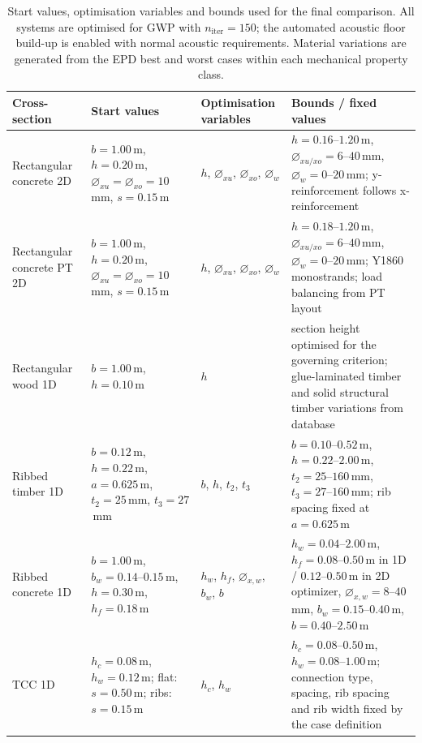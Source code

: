 \begin{table}[t]
    \centering
    \begingroup
    \scriptsize
    \setlength{\tabcolsep}{3pt}
    \renewcommand{\arraystretch}{1.15}
    \begin{tabularx}{\textwidth}{@{}l|X|X|X@{}}
    \hline
    \textbf{Cross-section} &
    \textbf{Start values} &
    \textbf{Optimisation variables} &
    \textbf{Bounds / fixed values} \\ \hline

    Rectangular concrete 2D &
    $b=1.00$\,m, $h=0.20$\,m, $\varnothing_{xu}=\varnothing_{xo}=10$\,mm, $s=0.15$\,m &
    $h$, $\varnothing_{xu}$, $\varnothing_{xo}$, $\varnothing_w$ &
    $h=0.16$--$1.20$\,m, $\varnothing_{xu/xo}=6$--$40$\,mm, $\varnothing_w=0$--$20$\,mm; y-reinforcement follows x-reinforcement \\

    Rectangular concrete PT 2D &
    $b=1.00$\,m, $h=0.20$\,m, $\varnothing_{xu}=\varnothing_{xo}=10$\,mm, $s=0.15$\,m &
    $h$, $\varnothing_{xu}$, $\varnothing_{xo}$, $\varnothing_w$ &
    $h=0.18$--$1.20$\,m, $\varnothing_{xu/xo}=6$--$40$\,mm, $\varnothing_w=0$--$20$\,mm; Y1860 monostrands; load balancing from PT layout \\

    Rectangular wood 1D &
    $b=1.00$\,m, $h=0.10$\,m &
    $h$ &
    section height optimised for the governing criterion; glue-laminated timber and solid structural timber variations from database \\

    Ribbed timber 1D &
    $b=0.12$\,m, $h=0.22$\,m, $a=0.625$\,m, $t_2=25$\,mm, $t_3=27$\,mm &
    $b$, $h$, $t_2$, $t_3$ &
    $b=0.10$--$0.52$\,m, $h=0.22$--$2.00$\,m, $t_2=25$--$160$\,mm, $t_3=27$--$160$\,mm; rib spacing fixed at $a=0.625$\,m \\

    Ribbed concrete 1D &
    $b=1.00$\,m, $b_w=0.14$--$0.15$\,m, $h=0.30$\,m, $h_f=0.18$\,m &
    $h_w$, $h_f$, $\varnothing_{x,w}$, $b_w$, $b$ &
    $h_w=0.04$--$2.00$\,m, $h_f=0.08$--$0.50$\,m in 1D / $0.12$--$0.50$\,m in 2D optimizer, $\varnothing_{x,w}=8$--$40$\,mm, $b_w=0.15$--$0.40$\,m, $b=0.40$--$2.50$\,m \\

    TCC 1D &
    $h_c=0.08$\,m, $h_w=0.12$\,m; flat: $s=0.50$\,m; ribs: $s=0.15$\,m &
    $h_c$, $h_w$ &
    $h_c=0.08$--$0.50$\,m, $h_w=0.08$--$1.00$\,m; connection type, spacing, rib spacing and rib width fixed by the case definition \\ \hline
    \end{tabularx}
    \endgroup
    \caption{Start values, optimisation variables and bounds used for the final comparison. All systems are optimised for GWP with $n_{\mathrm{iter}}=150$; the automated acoustic floor build-up is enabled with normal acoustic requirements. Material variations are generated from the EPD best and worst cases within each mechanical property class.}
\end{table}
